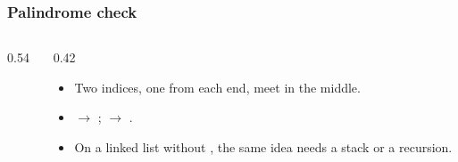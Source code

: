 \documentclass[aspectratio=169,10pt,compress]{beamer}
\begin{document}
\begin{frame}[t,fragile] \frametitle{Palindrome check}
  \begin{columns}[T]
    \begin{column}{0.54\textwidth}
    \end{column}
    \begin{column}{0.42\textwidth}
      \small
      \begin{itemize}
        \item Two indices, one from each end, meet in the middle.
        \item {} $\to$ ;
               $\to$ .
        \item On a linked list without , the same idea
              needs a stack or a recursion.
      \end{itemize}
    \end{column}
  \end{columns}
\end{frame}
\end{document}
